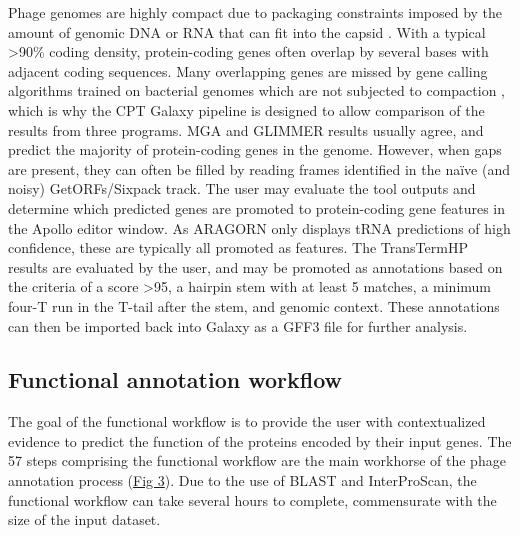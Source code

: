 Phage genomes are highly compact due to packaging constraints imposed by
the amount of genomic DNA or RNA that can fit into the capsid
\cite{Miller_2003,Kang_2017}. With a typical \textgreater90\% coding density,
protein-coding genes often overlap by several bases with adjacent coding
sequences. Many overlapping genes are missed by gene calling algorithms
trained on bacterial genomes which are not subjected to compaction
\cite{Kang_2017,McNair_2019,Akhter_2012}, which is why the CPT Galaxy pipeline is designed to allow
comparison of the results from three programs. MGA and GLIMMER results
usually agree, and predict the majority of protein-coding genes in the
genome. However, when gaps are present, they can often be filled by
reading frames identified in the naïve (and noisy) GetORFs/Sixpack
track. The user may evaluate the tool outputs and determine which
predicted genes are promoted to protein-coding gene features in the
Apollo editor window. As ARAGORN only displays tRNA predictions of high
confidence, these are typically all promoted as features. The
TransTermHP results are evaluated by the user, and may be promoted as
annotations based on the criteria of a score \textgreater95, a hairpin
stem with at least 5 matches, a minimum four-T run in the T-tail after
the stem, and genomic context. These annotations can then be imported
back into Galaxy as a GFF3 file for further analysis.

\subsection*{Functional annotation workflow}

The goal of the functional workflow is to provide the user with
contextualized evidence to predict the function of the proteins encoded
by their input genes. The 57 steps comprising the functional workflow
are the main workhorse of the phage annotation process
(\protect\hyperlink{pcbi.1008214.g003}{Fig 3}). Due to the use of BLAST
and InterProScan, the functional workflow can take several hours to
complete, commensurate with the size of the input dataset.

